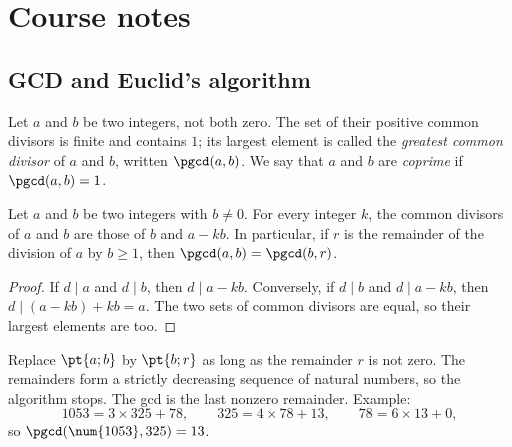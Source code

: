 \mxnewpage
\section{Course notes}
\subsection{GCD and Euclid's algorithm}
\begin{definition}[GCD]
Let $a$ and $b$ be two integers, not both zero. The set of their positive common divisors is finite and contains $1$; its largest element is called the \emph{greatest common divisor} of $a$ and $b$, written $\pgcd(a,b)$. We say that $a$ and $b$ are \emph{coprime} if $\pgcd(a,b)=1$.
\end{definition}
\begin{theorem}
Let $a$ and $b$ be two integers with $b\neq0$. For every integer $k$, the common divisors of $a$ and $b$ are those of $b$ and $a-kb$. In particular, if $r$ is the remainder of the division of $a$ by $b\ge1$, then $\pgcd(a,b)=\pgcd(b,r)$.
\end{theorem}
\begin{proof}
If $d\mid a$ and $d\mid b$, then $d\mid a-kb$. Conversely, if $d\mid b$ and $d\mid a-kb$, then $d\mid(a-kb)+kb=a$. The two sets of common divisors are equal, so their largest elements are too.
\end{proof}
\begin{method}
Replace $\pt{a;b}$ by $\pt{b;r}$ as long as the remainder $r$ is not zero. The remainders form a strictly decreasing sequence of natural numbers, so the algorithm stops. The gcd is the last nonzero remainder. Example:
\[\num{1053}=3\times325+78,\qquad325=4\times78+13,\qquad78=6\times13+0,\]
so $\pgcd(\num{1053},325)=13$.
\end{method}

